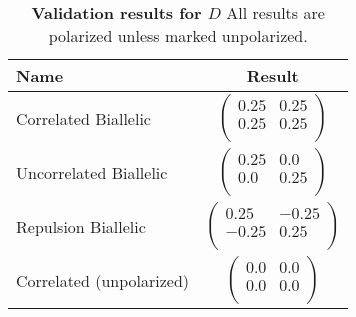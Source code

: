 \documentclass[12pt]{article}
\begin{document}
\begin{table}[H]
  \begin{tabular}{lc} Name & Result \\
    \hline
    Correlated Biallelic & $\left(\begin{array}{cc}
                                    0.25 & 0.25 \\
                                    0.25 & 0.25 \\
                                  \end{array}\right)$ \\
    Uncorrelated Biallelic & $\left(\begin{array}{cc}
                                      0.25 & 0.0 \\
                                      0.0 & 0.25 \\
                                    \end{array}\right)$ \\
    Repulsion Biallelic & $\left(\begin{array}{cc}
                                    0.25 & -0.25 \\
                                    -0.25 & 0.25 \\
                                 \end{array}\right)$ \\
    Correlated (unpolarized) & $\left(\begin{array}{cc}
                                        0.0 & 0.0 \\
                                        0.0 & 0.0 \\
                                      \end{array}\right)$ \\
  \end{tabular}
  \caption{
    \textbf{Validation results for $D$}
    All results are polarized unless marked unpolarized.
  }
\end{table}
\end{document}
